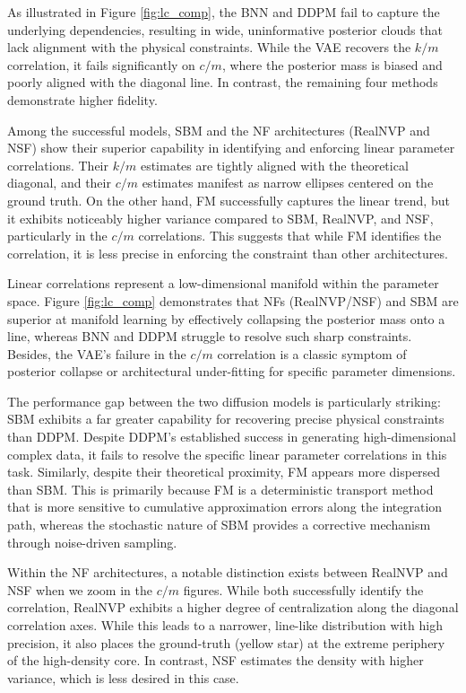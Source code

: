 As illustrated in Figure \ref{fig:lc_comp}, the \ac{BNN} and \ac{DDPM} fail to capture the underlying dependencies, resulting in wide, uninformative posterior clouds that lack alignment with the physical constraints. While the \ac{VAE} recovers the $k/m$ correlation, it fails significantly on $c/m$, where the posterior mass is biased and poorly aligned with the diagonal line. In contrast, the remaining four methods demonstrate higher fidelity. 

Among the successful models, \ac{SBM} and the \ac{NF} architectures (\ac{RealNVP} and \ac{NSF}) show their superior capability in identifying and enforcing linear parameter correlations. Their $k/m$ estimates are tightly aligned with the theoretical diagonal, and their $c/m$ estimates manifest as narrow ellipses centered on the ground truth. On the other hand, \ac{FM} successfully captures the linear trend, but it exhibits noticeably higher variance compared to \ac{SBM}, \ac{RealNVP}, and \ac{NSF}, particularly in the $c/m$ correlations. This suggests that while \ac{FM} identifies the correlation, it is less precise in enforcing the constraint than other architectures.

Linear correlations represent a low-dimensional manifold within the parameter space. Figure \ref{fig:lc_comp} demonstrates that \acp{NF} (\ac{RealNVP}/\ac{NSF}) and \ac{SBM} are superior at manifold learning by effectively collapsing the posterior mass onto a line, whereas \ac{BNN} and \ac{DDPM} struggle to resolve such sharp constraints. Besides, the \ac{VAE}’s failure in the $c/m$ correlation is a classic symptom of posterior collapse or architectural under-fitting for specific parameter dimensions. 

The performance gap between the two diffusion models is particularly striking: \ac{SBM} exhibits a far greater capability for recovering precise physical constraints than \ac{DDPM}. Despite \ac{DDPM}'s established success in generating high-dimensional complex data, it fails to resolve the specific linear parameter correlations in this task.
Similarly, despite their theoretical proximity, \ac{FM} appears more dispersed than \ac{SBM}. This is primarily because \ac{FM} is a deterministic transport method that is more sensitive to cumulative approximation errors along the integration path, whereas the stochastic nature of \ac{SBM} provides a corrective mechanism through noise-driven sampling.

Within the \ac{NF} architectures, a notable distinction exists between \ac{RealNVP} and \ac{NSF} when we zoom in the $c/m$ figures. While both successfully identify the correlation, \ac{RealNVP} exhibits a higher degree of centralization along the diagonal correlation axes. While this leads to a narrower, line-like distribution with high precision, it also places the ground-truth (yellow star) at the extreme periphery of the high-density core. In contrast, \ac{NSF} estimates the density with higher variance, which is less desired in this case. 

